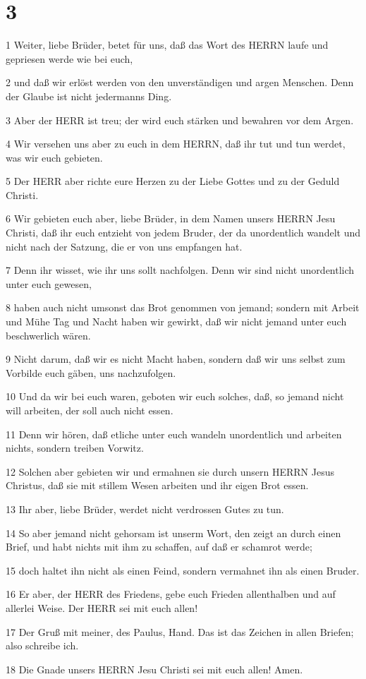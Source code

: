 \chapter{3}

\par 1 Weiter, liebe Brüder, betet für uns, daß das Wort des HERRN laufe und gepriesen werde wie bei euch,
\par 2 und daß wir erlöst werden von den unverständigen und argen Menschen. Denn der Glaube ist nicht jedermanns Ding.
\par 3 Aber der HERR ist treu; der wird euch stärken und bewahren vor dem Argen.
\par 4 Wir versehen uns aber zu euch in dem HERRN, daß ihr tut und tun werdet, was wir euch gebieten.
\par 5 Der HERR aber richte eure Herzen zu der Liebe Gottes und zu der Geduld Christi.
\par 6 Wir gebieten euch aber, liebe Brüder, in dem Namen unsers HERRN Jesu Christi, daß ihr euch entzieht von jedem Bruder, der da unordentlich wandelt und nicht nach der Satzung, die er von uns empfangen hat.
\par 7 Denn ihr wisset, wie ihr uns sollt nachfolgen. Denn wir sind nicht unordentlich unter euch gewesen,
\par 8 haben auch nicht umsonst das Brot genommen von jemand; sondern mit Arbeit und Mühe Tag und Nacht haben wir gewirkt, daß wir nicht jemand unter euch beschwerlich wären.
\par 9 Nicht darum, daß wir es nicht Macht haben, sondern daß wir uns selbst zum Vorbilde euch gäben, uns nachzufolgen.
\par 10 Und da wir bei euch waren, geboten wir euch solches, daß, so jemand nicht will arbeiten, der soll auch nicht essen.
\par 11 Denn wir hören, daß etliche unter euch wandeln unordentlich und arbeiten nichts, sondern treiben Vorwitz.
\par 12 Solchen aber gebieten wir und ermahnen sie durch unsern HERRN Jesus Christus, daß sie mit stillem Wesen arbeiten und ihr eigen Brot essen.
\par 13 Ihr aber, liebe Brüder, werdet nicht verdrossen Gutes zu tun.
\par 14 So aber jemand nicht gehorsam ist unserm Wort, den zeigt an durch einen Brief, und habt nichts mit ihm zu schaffen, auf daß er schamrot werde;
\par 15 doch haltet ihn nicht als einen Feind, sondern vermahnet ihn als einen Bruder.
\par 16 Er aber, der HERR des Friedens, gebe euch Frieden allenthalben und auf allerlei Weise. Der HERR sei mit euch allen!
\par 17 Der Gruß mit meiner, des Paulus, Hand. Das ist das Zeichen in allen Briefen; also schreibe ich.
\par 18 Die Gnade unsers HERRN Jesu Christi sei mit euch allen! Amen.

